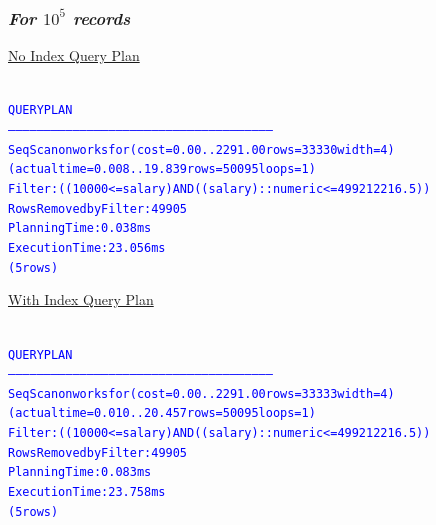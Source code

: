 \documentclass{article}
\begin{document}
    \subsubsection*{\emph{For $10^5$ records}}
    \underline{No Index Query Plan}
    \begin{center}
      {\tiny
      \begin{alltt}
      \textcolor{blue}{
        QUERY PLAN                                                  
        --------------------------------------------------------------------------------------------------------------
         Seq Scan on worksfor  (cost=0.00..2291.00 rows=33330 width=4) (actual time=0.008..19.839 rows=50095 loops=1)
           Filter: ((10000 <= salary) AND ((salary)::numeric <= 499212216.5))
           Rows Removed by Filter: 49905
         Planning Time: 0.038 ms
         Execution Time: 23.056 ms
        (5 rows)
       }
      \end{alltt}
      }
    \end{center}
    \underline{With Index Query Plan}
    \begin{center}
      {\tiny
      \begin{alltt}
      \textcolor{blue}{
        QUERY PLAN                                                  
        --------------------------------------------------------------------------------------------------------------
         Seq Scan on worksfor  (cost=0.00..2291.00 rows=33333 width=4) (actual time=0.010..20.457 rows=50095 loops=1)
           Filter: ((10000 <= salary) AND ((salary)::numeric <= 499212216.5))
           Rows Removed by Filter: 49905
         Planning Time: 0.083 ms
         Execution Time: 23.758 ms
        (5 rows)
       }
      \end{alltt}
      }
    \end{center}
\end{document}
